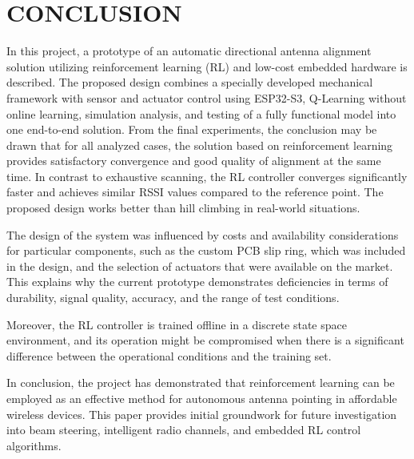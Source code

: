 \newpage
\section{CONCLUSION}

In this project, a prototype of an automatic directional antenna alignment solution utilizing reinforcement learning (RL) and low-cost embedded hardware is described. The proposed design combines a specially developed mechanical framework with sensor and actuator control using ESP32-S3, Q-Learning without online learning, simulation analysis, and testing of a fully functional model into one end-to-end solution. From the final experiments, the conclusion may be drawn that for all analyzed cases, the solution based on reinforcement learning provides satisfactory convergence and good quality of alignment at the same time. In contrast to exhaustive scanning, the RL controller converges significantly faster and achieves similar RSSI values compared to the reference point. The proposed design works better than hill climbing in real-world situations.

The design of the system was influenced by costs and availability considerations for particular components, such as the custom PCB slip ring, which was included in the design, and the selection of actuators that were available on the market. This explains why the current prototype demonstrates deficiencies in terms of durability, signal quality, accuracy, and the range of test conditions.

Moreover, the RL controller is trained offline in a discrete state space environment, and its operation might be compromised when there is a significant difference between the operational conditions and the training set.

In conclusion, the project has demonstrated that reinforcement learning can be employed as an effective method for autonomous antenna pointing in affordable wireless devices. This paper provides initial groundwork for future investigation into beam steering, intelligent radio channels, and embedded RL control algorithms.